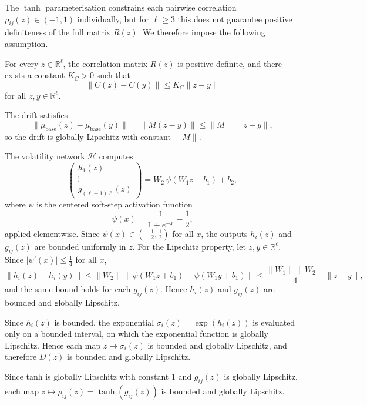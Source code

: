 The $\tanh$ parameterisation constrains each pairwise correlation $\rho_{ij}(z)\in(-1,1)$ individually, but for $\ell\geq3$ this does not guarantee positive definiteness of the full matrix $R(z)$. We therefore 
impose the following assumption.

\begin{assumption}
\label{ass:baseline_cholesky}
For every $z\in\mathbb{R}^\ell$, the correlation matrix $R(z)$ is positive 
definite, and there exists a constant $K_C>0$ such that
\[
\|C(z)-C(y)\|\leq K_C\|z-y\|
\]
for all $z,y\in\mathbb{R}^\ell$.
\end{assumption}


\begin{description}[
    style=unboxed,
    leftmargin=0pt,
    labelindent=0pt,
    labelsep=0.5em
]

\item[Drift.]
The drift satisfies
\[
\|\mu_{\mathrm{base}}(z)-\mu_{\mathrm{base}}(y)\|
=
\|M(z-y)\|
\leq
\|M\|\,\|z-y\|,
\]
so the drift is globally Lipschitz with constant $\|M\|$.

\item[Diffusion.]
The volatility network $\mathcal{H}$ computes
\[
\begin{pmatrix} h_1(z) \\ \vdots \\ g_{(\ell-1)\ell}(z) \end{pmatrix}
=
W_2\,\psi(W_1 z + b_1) + b_2,
\]
where $\psi$ is the centered soft-step activation function
\[
\psi(x)=\frac{1}{1+e^{-x}}-\frac{1}{2},
\]
applied elementwise. Since $\psi(x)\in(-\tfrac{1}{2},
\tfrac{1}{2})$ for all $x$, the outputs $h_i(z)$ and $g_{ij}(z)$ are
bounded uniformly in $z$. For the Lipschitz property, let
$z,y\in\mathbb{R}^\ell$. Since $|\psi'(x)|\leq\tfrac{1}{4}$ for all $x$,
\[
\|h_i(z)-h_i(y)\|
\leq
\|W_2\|\,\|\psi(W_1 z+b_1)-\psi(W_1 y+b_1)\|
\leq
\frac{\|W_1\|\,\|W_2\|}{4}\|z-y\|,
\]
and the same bound holds for each $g_{ij}(z)$. Hence $h_i(z)$ and $g_{ij}(z)$ are bounded and globally Lipschitz.

Since $h_i(z)$ is bounded, the exponential $\sigma_i(z)=\exp(h_i(z))$ is evaluated only on a bounded interval, on which the exponential function is 
globally Lipschitz. Hence each map $z\mapsto\sigma_i(z)$ is bounded and globally Lipschitz, and therefore $D(z)$ is bounded and globally Lipschitz.


Since tanh is globally Lipschitz with constant $1$ and $g_{ij}(z)$ is globally Lipschitz, each map $z\mapsto\rho_{ij}(z)=\tanh(g_{ij}(z))$ is bounded and globally Lipschitz.


\end{description}
